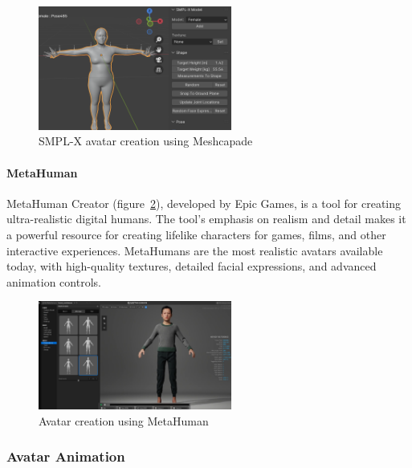\documentclass[../../main.tex]{subfiles}
\begin{document}
\begin{figure} 
  \centering \includegraphics[width = 2.5in]{chapters/background_work/images/smpl_creation_example.png} 
  \caption{SMPL-X avatar creation using Meshcapade} 
  \label{fig:smpl_creation_example} 
\end{figure}

\paragraph{MetaHuman}
\label{ch:background_work:sign_language_synthesis:3d_techniques:procedural_avatar_creation:metahuman}

MetaHuman Creator (figure~\ref{fig:metahuman_example}), developed by Epic Games, is a tool for creating ultra-realistic digital humans. The tool's emphasis on realism and detail makes it a powerful resource for creating lifelike characters for games, films, and other interactive experiences. MetaHumans are the most realistic avatars available today, with high-quality textures, detailed facial expressions, and advanced animation controls.

\begin{figure} 
  \centering \includegraphics[width = 2.5in]{chapters/background_work/images/metahuman_example.png} 
  \caption{Avatar creation using MetaHuman} 
  \label{fig:metahuman_example}
\end{figure}

\subsubsection{Avatar Animation}
\label{ch:background_work:sign_language_synthesis:3d_techniques:avatar_animation}
\end{document}
